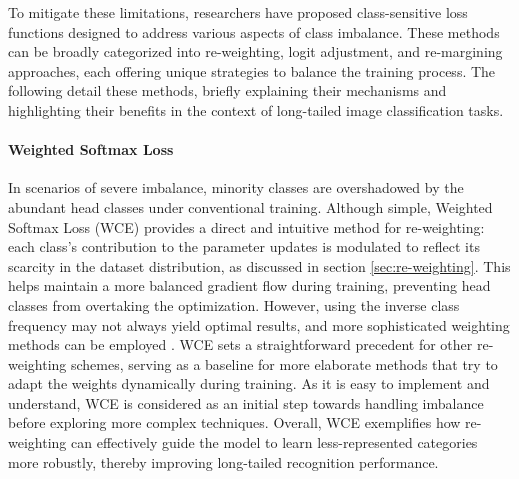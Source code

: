 To mitigate these limitations, researchers have proposed class-sensitive loss functions designed to address various aspects of class imbalance. These methods can be broadly categorized into re-weighting, logit adjustment, and re-margining approaches, each offering unique strategies to balance the training process. The following detail these methods, briefly explaining their mechanisms and highlighting their benefits in the context of long-tailed image classification tasks.

\paragraph{Weighted Softmax Loss}
In scenarios of severe imbalance, minority classes are overshadowed by the abundant head classes under conventional training. Although simple, Weighted Softmax Loss (WCE) \cite{zhang2023deep} provides a direct and intuitive method for re-weighting: each class's contribution to the parameter updates is modulated to reflect its scarcity in the dataset distribution, as discussed in section \ref{sec:re-weighting}. This helps maintain a more balanced gradient flow during training, preventing head classes from overtaking the optimization. However, using the inverse class frequency may not always yield optimal results, and more sophisticated weighting methods can be employed \cite{zhang2023deep}. WCE sets a straightforward precedent for other re-weighting schemes, serving as a baseline for more elaborate methods that try to adapt the weights dynamically during training. As it is easy to implement and understand, WCE is considered as an initial step towards handling imbalance before exploring more complex techniques. Overall, WCE exemplifies how re-weighting can effectively guide the model to learn less-represented categories more robustly, thereby improving long-tailed recognition performance.

